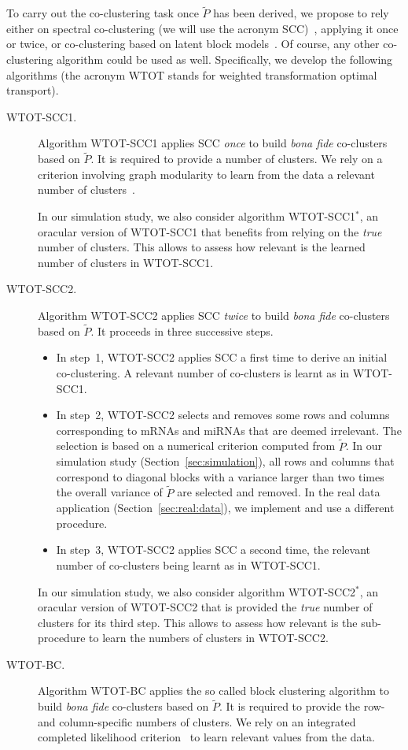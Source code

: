 To carry  out the  co-clustering task  once $\tilde{P}$  has been  derived, we
propose to  rely either  on spectral  co-clustering (we  will use  the acronym
SCC)~\cite{10.1145/502512.502550}, applying it once or twice, or co-clustering
based  on   latent  block  models~\cite{Nadif2010}.   Of   course,  any  other
co-clustering algorithm could  be used as well.  Specifically,  we develop the
following  algorithms (the  acronym  WTOT stands  for weighted  transformation
optimal transport).
\begin{description}
\item[WTOT-SCC1.]   Algorithm WTOT-SCC1  applies  SCC  \textit{once} to  build
  \textit{bona  fide} co-clusters  based on  $\tilde{P}$.  It  is required  to
  provide  a number  of  clusters.  We  rely on  a  criterion involving  graph
  modularity   to    learn   from    the   data    a   relevant    number   of
  clusters~\cite[Sections~2 and 4]{AILEM2016160}.

  In  our  simulation study,  we  also  consider algorithm  WTOT-SCC1$^*$,  an
  oracular  version   of  WTOT-SCC1   that  benefits   from  relying   on  the
  \textit{true} number of clusters.  This allows to assess how relevant is the
  learned number of clusters in WTOT-SCC1.
\item[WTOT-SCC2.]   Algorithm WTOT-SCC2  applies SCC  \textit{twice} to  build
  \textit{bona fide}  co-clusters based on  $\tilde{P}$. It proceeds  in three
  successive steps.
  \begin{itemize}
  \item In  step~1, WTOT-SCC2 applies  SCC a first  time to derive  an initial
    co-clustering.   A  relevant  number  of   co-clusters  is  learnt  as  in
    WTOT-SCC1.
  \item  In  step~2, WTOT-SCC2  selects  and  removes  some rows  and  columns
    corresponding  to  mRNAs  and  miRNAs that  are  deemed  irrelevant.   The
    selection is based on a numerical criterion computed from $\tilde{P}$.  In
    our simulation study (Section~\ref{sec:simulation}),  all rows and columns
    that correspond to  diagonal blocks with a variance larger  than two times
    the overall variance of $\tilde{P}$ are  selected and removed. In the real
    data  application (Section~\ref{sec:real:data}),  we implement  and use  a
    different procedure.
  \item In step~3, WTOT-SCC2 applies SCC a second time, the relevant number of
    co-clusters being learnt as in WTOT-SCC1.
  \end{itemize}
  In  our  simulation study,  we  also  consider algorithm  WTOT-SCC2$^*$,  an
  oracular version of  WTOT-SCC2 that is provided the  \textit{true} number of
  clusters for  its third  step.  This  allows to assess  how relevant  is the
  sub-procedure to learn the numbers of clusters in WTOT-SCC2.
\item[WTOT-BC.]   Algorithm WTOT-BC  applies  the so  called block  clustering
  algorithm to build  \textit{bona fide} co-clusters based  on $\tilde{P}$. It
  is required to provide the row-  and column-specific numbers of clusters. We
  rely on  an integrated completed likelihood  criterion~\cite{Keribin2014} to
  learn relevant values from the data.
\end{description}
